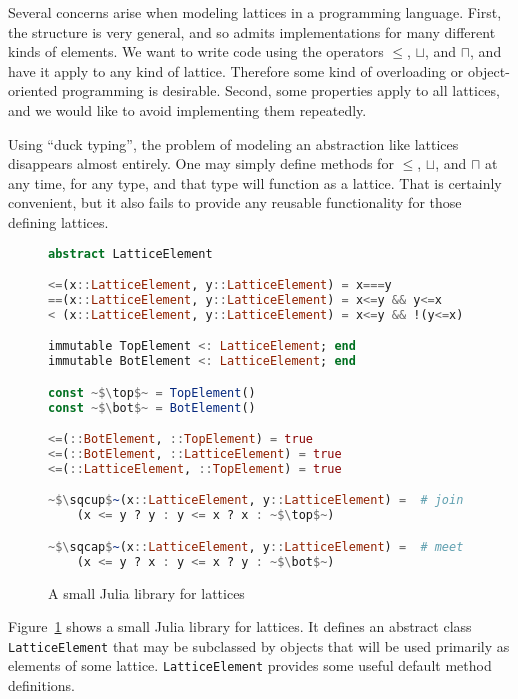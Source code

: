 Several concerns arise when modeling lattices in a programming language.
First, the structure is very general, and so admits implementations
for many different kinds of elements.
We want to write code using the operators $\leq$, $\sqcup$, and $\sqcap$, and
have it apply to any kind of lattice.
Therefore some kind of overloading or object-oriented programming
is desirable.
Second, some properties apply to all lattices, and we would
like to avoid implementing them repeatedly.

Using ``duck typing'', the problem of modeling an abstraction like lattices
disappears almost entirely.
One may simply define methods for $\leq$, $\sqcup$, and $\sqcap$ at any time,
for any type, and that type will function as a lattice.
That is certainly convenient, but it also fails to provide any reusable
functionality for those defining lattices.

\begin{figure}[!t]
  \begin{center}
\begin{singlespace}
\begin{lstlisting}[language=julia]
abstract LatticeElement

<=(x::LatticeElement, y::LatticeElement) = x===y
==(x::LatticeElement, y::LatticeElement) = x<=y && y<=x
< (x::LatticeElement, y::LatticeElement) = x<=y && !(y<=x)

immutable TopElement <: LatticeElement; end
immutable BotElement <: LatticeElement; end

const ~$\top$~ = TopElement()
const ~$\bot$~ = BotElement()

<=(::BotElement, ::TopElement) = true
<=(::BotElement, ::LatticeElement) = true
<=(::LatticeElement, ::TopElement) = true

~$\sqcup$~(x::LatticeElement, y::LatticeElement) =  # join
    (x <= y ? y : y <= x ? x : ~$\top$~)

~$\sqcap$~(x::LatticeElement, y::LatticeElement) =  # meet
    (x <= y ? x : y <= x ? y : ~$\bot$~)
\end{lstlisting}
\end{singlespace}
  \end{center}
  \label{julialattices}
  \caption{A small Julia library for lattices}
\end{figure}

Figure~\ref{julialattices} shows a small Julia library for lattices.
It defines an abstract class \texttt{LatticeElement} that may be subclassed
by objects that will be used primarily as elements of some lattice.
\texttt{LatticeElement} provides some useful default method definitions.

\fi
